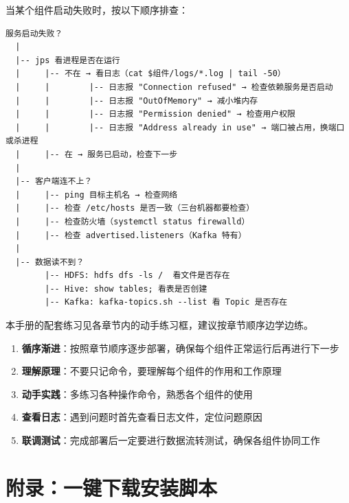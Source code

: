 \documentclass[12pt,a4paper]{article}
\begin{document}
\begin{warnbox}
当某个组件启动失败时，按以下顺序排查：

\begin{footnotesize}
\begin{verbatim}
服务启动失败？
  |
  |-- jps 看进程是否在运行
  |     |-- 不在 → 看日志（cat $组件/logs/*.log | tail -50）
  |     |        |-- 日志报 "Connection refused" → 检查依赖服务是否启动
  |     |        |-- 日志报 "OutOfMemory" → 减小堆内存
  |     |        |-- 日志报 "Permission denied" → 检查用户权限
  |     |        |-- 日志报 "Address already in use" → 端口被占用，换端口或杀进程
  |     |-- 在 → 服务已启动，检查下一步
  |
  |-- 客户端连不上？
  |     |-- ping 目标主机名 → 检查网络
  |     |-- 检查 /etc/hosts 是否一致（三台机器都要检查）
  |     |-- 检查防火墙（systemctl status firewalld）
  |     |-- 检查 advertised.listeners（Kafka 特有）
  |
  |-- 数据读不到？
        |-- HDFS: hdfs dfs -ls /  看文件是否存在
        |-- Hive: show tables; 看表是否创建
        |-- Kafka: kafka-topics.sh --list 看 Topic 是否存在
\end{verbatim}
\end{footnotesize}
\end{warnbox}

\begin{tipbox}[配套练习]
本手册的配套练习见各章节内的动手练习框，建议按章节顺序边学边练。
\end{tipbox}

\begin{tipbox}[学习建议]
\begin{enumerate}
    \item \textbf{循序渐进}：按照章节顺序逐步部署，确保每个组件正常运行后再进行下一步
    \item \textbf{理解原理}：不要只记命令，要理解每个组件的作用和工作原理
    \item \textbf{动手实践}：多练习各种操作命令，熟悉各个组件的使用
    \item \textbf{查看日志}：遇到问题时首先查看日志文件，定位问题原因
    \item \textbf{联调测试}：完成部署后一定要进行数据流转测试，确保各组件协同工作
\end{enumerate}
\end{tipbox}

\section{附录：一键下载安装脚本}
\end{document}
